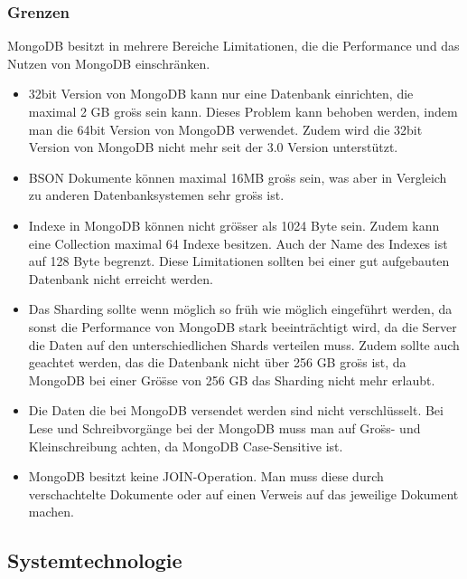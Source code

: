 \subsubsection{Grenzen}
MongoDB besitzt in mehrere Bereiche Limitationen, die die Performance und das Nutzen von MongoDB einschr\"anken. 
\begin{itemize}
\item 32bit Version von MongoDB kann nur eine Datenbank einrichten, die maximal 2 GB gro\"ss sein kann. Dieses Problem kann behoben werden, indem man die 64bit Version von MongoDB verwendet. Zudem wird die 32bit Version von MongoDB nicht mehr seit der 3.0 Version unterst\"utzt.
\item BSON Dokumente k\"onnen maximal 16MB gro\"ss sein, was aber in Vergleich zu anderen Datenbanksystemen sehr gro\"ss ist.
\item Indexe in MongoDB k\"onnen nicht gr\"o\"sser als 1024 Byte sein. Zudem kann eine Collection maximal 64 Indexe besitzen. Auch der Name des Indexes ist auf 128 Byte begrenzt. Diese Limitationen sollten bei einer gut aufgebauten Datenbank nicht erreicht werden.
\item Das Sharding sollte wenn m\"oglich so fr\"uh wie m\"oglich eingef\"uhrt werden, da sonst die Performance von MongoDB stark beeintr\"achtigt wird, da die Server die Daten auf den unterschiedlichen Shards verteilen muss. Zudem sollte auch geachtet werden, das die Datenbank nicht \"uber 256 GB gro\"ss ist, da MongoDB bei einer Gr\"o\"sse von 256 GB das Sharding nicht mehr erlaubt.
\item Die Daten die bei MongoDB versendet werden sind nicht verschl\"usselt.
Bei Lese und Schreibvorg\"ange bei der MongoDB muss man auf Gro\"ss- und Kleinschreibung achten, da MongoDB Case-Sensitive ist.
\item MongoDB besitzt keine JOIN-Operation. Man muss diese durch verschachtelte Dokumente oder auf einen Verweis auf das jeweilige Dokument machen.
\end{itemize}
\subsection{Systemtechnologie}
